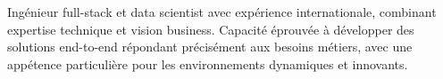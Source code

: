 


\begin{cvparagraph}
Ingénieur full-stack et data scientist avec expérience internationale, combinant expertise technique et vision business. Capacité éprouvée à développer des solutions end-to-end répondant précisément aux besoins métiers, avec une appétence particulière pour les environnements dynamiques et innovants.
\end{cvparagraph}